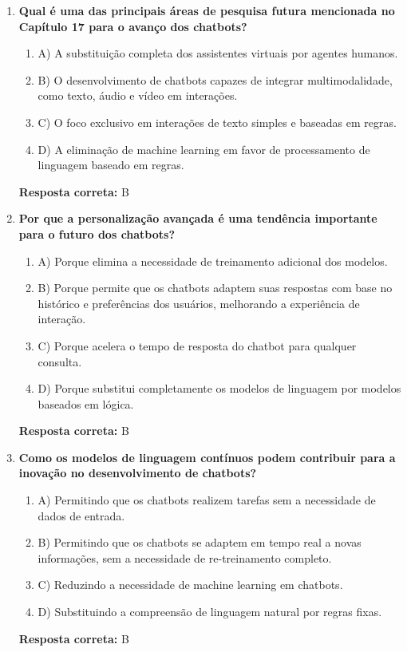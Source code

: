 \documentclass[14pt,a4paper,oneside]{book}
\begin{document}
\begin{enumerate}
	
	\item \textbf{Qual é uma das principais áreas de pesquisa futura mencionada no Capítulo 17 para o avanço dos chatbots?}
	\begin{enumerate}[label=\alph*)]
		\item A) A substituição completa dos assistentes virtuais por agentes humanos.
		\item B) O desenvolvimento de chatbots capazes de integrar multimodalidade, como texto, áudio e vídeo em interações.
		\item C) O foco exclusivo em interações de texto simples e baseadas em regras.
		\item D) A eliminação de machine learning em favor de processamento de linguagem baseado em regras.
	\end{enumerate}
	\vspace{5mm}
	\textbf{Resposta correta:} B
	
	\item \textbf{Por que a personalização avançada é uma tendência importante para o futuro dos chatbots?}
	\begin{enumerate}[label=\alph*)]
		\item A) Porque elimina a necessidade de treinamento adicional dos modelos.
		\item B) Porque permite que os chatbots adaptem suas respostas com base no histórico e preferências dos usuários, melhorando a experiência de interação.
		\item C) Porque acelera o tempo de resposta do chatbot para qualquer consulta.
		\item D) Porque substitui completamente os modelos de linguagem por modelos baseados em lógica.
	\end{enumerate}
	\vspace{5mm}
	\textbf{Resposta correta:} B
	
	\item \textbf{Como os modelos de linguagem contínuos podem contribuir para a inovação no desenvolvimento de chatbots?}
	\begin{enumerate}[label=\alph*)]
		\item A) Permitindo que os chatbots realizem tarefas sem a necessidade de dados de entrada.
		\item B) Permitindo que os chatbots se adaptem em tempo real a novas informações, sem a necessidade de re-treinamento completo.
		\item C) Reduzindo a necessidade de machine learning em chatbots.
		\item D) Substituindo a compreensão de linguagem natural por regras fixas.
	\end{enumerate}
	\vspace{5mm}
	\textbf{Resposta correta:} B
	

\end{enumerate}
\end{document}
